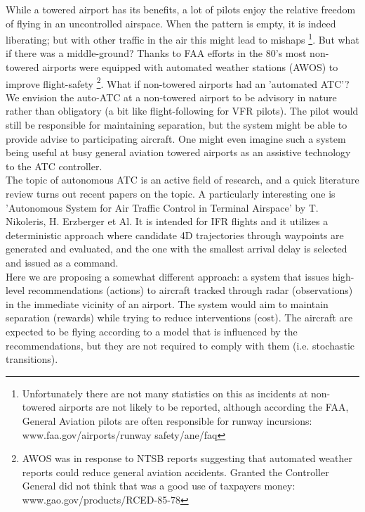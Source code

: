 \documentclass[english]{article}
\begin{document}
While a towered airport has its benefits, a lot of pilots enjoy the relative freedom of flying in an uncontrolled airspace. When the pattern is empty, it is indeed liberating; but with other traffic in the air this might lead to mishaps \footnote{Unfortunately there are not many statistics on this as incidents at non-towered airports are not likely to be reported, although according the FAA, General Aviation pilots are often responsible for runway incursions: www.faa.gov/airports/runway safety/ane/faq}. But what if there was a middle-ground? Thanks to FAA efforts in the 80's most non-towered airports were equipped with automated weather stations (AWOS) to improve flight-safety \footnote{AWOS was in response to NTSB reports suggesting that automated weather reports could reduce general aviation accidents. Granted the Controller General did not think that was a good use of taxpayers money: www.gao.gov/products/RCED-85-78}. What if non-towered airports had an 'automated ATC'?\\

We envision the auto-ATC at a non-towered airport to be advisory in nature rather than obligatory (a bit like flight-following for VFR pilots). The pilot would still be responsible for maintaining separation, but the system might be able to provide advise to participating aircraft. One might even imagine such a system being useful at busy general aviation towered airports as an assistive technology to the ATC controller.\\

The topic of autonomous ATC is an active field of research, and a quick literature review turns out recent papers on the topic. A particularly interesting one is 'Autonomous System for Air Traffic Control in Terminal Airspace' by T. Nikoleris, H. Erzberger et Al. It is intended for IFR flights and it utilizes a deterministic approach where candidate 4D trajectories through waypoints are generated and evaluated, and the one with the smallest arrival delay is selected and issued as a command.\\

Here we are proposing a somewhat different approach: a system that issues high-level recommendations (actions) to aircraft tracked through radar (observations) in the immediate vicinity of an airport. The system would aim to maintain separation (rewards) while trying to reduce interventions (cost). The aircraft are expected to be flying according to a model that is influenced by the recommendations, but they are not required to comply with them (i.e. stochastic transitions).
\end{document}
